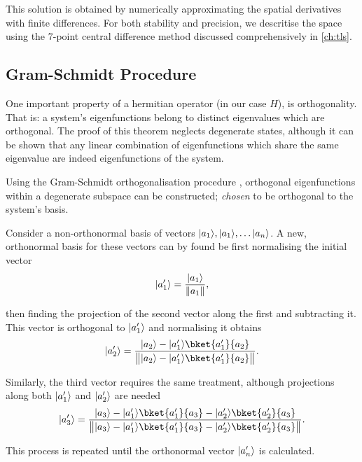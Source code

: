 This solution is obtained by numerically approximating the spatial derivatives with finite differences.
For both stability and precision, we descritise the space using the $7$-point central difference method discussed comprehensively in \cref{ch:tls}.

\subsection{Gram-Schmidt Procedure}\label{sec:gsp}

One important property of a hermitian operator (in our case $H$), is orthogonality. That is: a system's eigenfunctions belong to distinct eigenvalues which are orthogonal.
The proof of this theorem neglects degenerate states, although it can be shown that any linear combination of eigenfunctions which share the same eigenvalue are indeed eigenfunctions of the system.

Using the Gram-Schmidt orthogonalisation procedure \cite{Gram1883, Schmidt1907}, orthogonal eigenfunctions within a degenerate subspace can be constructed; \textit{chosen} to be orthogonal to the system's basis.

Consider a non-orthonormal basis of vectors $\lvert a_1\rangle, \lvert a_1\rangle, \ldots \lvert a_n\rangle$.
A new, orthonormal basis for these vectors can by found be first normalising the initial vector
\begin{equation}
\lvert a^\prime_1\rangle = \frac{\lvert a_1\rangle}{\lVert a_1\rVert},
\end{equation}

then finding the projection of the second vector along the first and subtracting it.
This vector is orthogonal to $\lvert a^\prime_1\rangle$ and normalising it obtains
\begin{equation}
\ket{a^\prime_2} = \frac{\ket{a_2}-\ket{a^\prime_1}\bket{a^\prime_1}{a_2}}{\norm[\big]{\ket{a_2}-\ket{a^\prime_1}\bket{a^\prime_1}{a_2}}}.
\end{equation}

Similarly, the third vector requires the same treatment, although projections along both $\lvert a^\prime_1\rangle$ and $\lvert a^\prime_2\rangle$ are needed
\begin{equation}
\ket{a^\prime_3} = \frac{\ket{a_3}-\ket{a^\prime_1}\bket{a^\prime_1}{a_3}-\ket{a^\prime_2}\bket{a^\prime_2}{a_3}}{\norm[\big]{\ket{a_3}-\ket{a^\prime_1}\bket{a^\prime_1}{a_3}-\ket{a^\prime_2}\bket{a^\prime_2}{a_3}}}.\label{eq:gs3ex}
\end{equation}

This process is repeated until the orthonormal vector $\lvert a^\prime_n\rangle$ is calculated.

